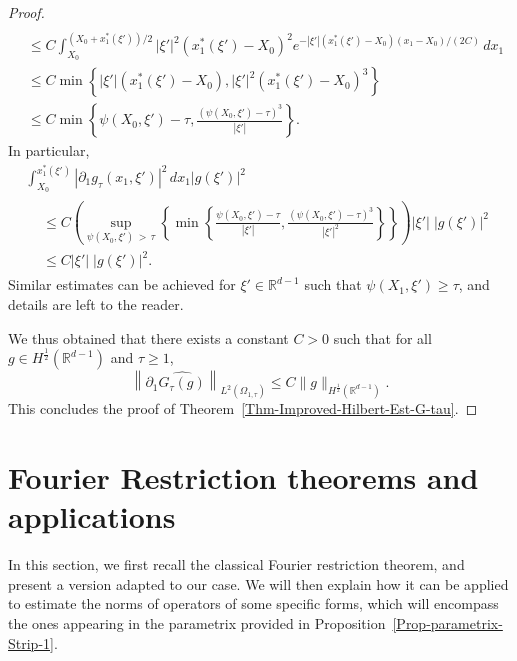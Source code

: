 \documentclass[10pt]{amsart}
\theoremstyle{definition}\newtheorem{defi}[theo]{Definition}\newtheorem{rema}[theo]{Remark}\newtheorem{exam}[theo]{Example}\newtheorem{exem}[theo]{Example}\newtheorem{nota}[theo]{Notation}
\newcommand*\R{\mathbb{R}}
\renewcommand{\leq}{\leqslant}
\renewcommand{\geq}{\geqslant}
\begin{document}
\begin{proof}
\begin{align*}
\\
& \leq C \int_{X_0}^{\left(X_0+x_1^*(\xi')\right)/2} |\xi'|^2 \left(x_1^*(\xi') - X_0\right)^2 e^{- |\xi'| \left(x_1^*(\xi') - X_0\right) (x_1 -X_0)/(2C)} \, dx_1
\\
& \leq C \min\left\{ |\xi'| (x_1^*(\xi') - X_0), |\xi'|^2 \left(x_1^*(\xi') - X_0\right)^3 \right\}
\\
&
\leq C \min\left\{ \psi(X_0, \xi') - \tau, \frac{(\psi(X_0,\xi') - \tau)^3}{|\xi'|} \right\}.
\end{align*}
In particular,
\begin{multline*}
\int_{X_0}^{x_1^*(\xi')} \left|\partial_1 g_\tau(x_1, \xi')\right|^2 \, dx_1 |g(\xi')|^2
\\
\begin{aligned}
&\leq C
\left(\!\sup_{\psi(X_0, \xi')\,>\,\tau} \left\{ \min\left\{ \frac{\psi(X_0, \xi') - \tau}{|\xi'|}, \frac{(\psi(X_0,\xi') \!-\! \tau)^3}{|\xi'|^2} \right\}\right\} \!\right) \left|\xi'\right|\; \left|g(\xi')\right|^2\\
&\leq \! C \left|\xi'\right|\; \left|g(\xi')\right|^2.
\end{aligned}
\end{multline*}
Similar estimates can be achieved for $\xi' \in \R^{d-1}$ such that $\psi(X_1, \xi') \geq \tau$, and details are left to the reader.

We thus obtained that there exists a constant $C>0$ such that for all $g \in H^{\frac{1}{2}}(\R^{d-1})$ and $\tau \geq 1$,
\begin{equation*}
\left\|\partial_1 \widehat{ G_{\tau} (g)} \right\|_{L^2(\Omega_{1,\tau})}
\leq C \| g \|_{H^{\frac{1}{2}}\left(\R^{d-1}\right)}.
\end{equation*}
This concludes the proof of Theorem~\ref{Thm-Improved-Hilbert-Est-G-tau}.
\end{proof}

\section{Fourier Restriction theorems and applications}\label{Sec-Fourier-Restriction-Thm}

In this section, we first recall the classical Fourier restriction theorem, and present a version adapted to our case. We will then explain how it can be applied to estimate the norms of operators of some specific forms, which will encompass the ones appearing in the parametrix provided in Proposition~\ref{Prop-parametrix-Strip-1}.
\end{document}

